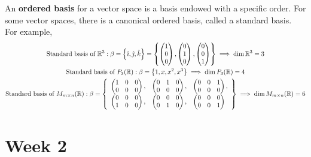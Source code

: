 \documentclass{report}
\begin{document}
An \textbf{ordered basis} for a vector space is a basis endowed with a specific order. For some vector spaces, there is a canonical ordered basis, called a standard basis. For example,
\begin{gather*}
  \text{Standard basis of }\mathbb{R}^3: \beta = \left\lbrace \hat{\imath}, \hat{\jmath}, \hat{k} \right\rbrace = \left\lbrace \begin{pmatrix} 1 \\ 0 \\ 0 \end{pmatrix}, \begin{pmatrix} 0 \\ 1 \\ 0 \end{pmatrix}, \begin{pmatrix} 0 \\ 0 \\ 1 \end{pmatrix} \right\rbrace \implies \dim\mathbb{R}^3 = 3 \\
  \text{Standard basis of }P_3(\mathbb{R}): \beta = \left\lbrace 1, x, x^2, x^3 \right\rbrace \implies \dim P_3(\mathbb{R}) = 4 \\
  \text{Standard basis of }M_{m\times n}(\mathbb{R}): \beta = \left\lbrace \begin{array}{lll} \begin{pmatrix} 1 & 0 & 0 \\ 0 & 0 & 0 \end{pmatrix}, & \begin{pmatrix} 0 & 1 & 0 \\ 0 & 0 & 0 \end{pmatrix}, & \begin{pmatrix} 0 & 0 & 1 \\ 0 & 0 & 0 \end{pmatrix}, \\ \begin{pmatrix} 0 & 0 & 0 \\ 1 & 0 & 0 \end{pmatrix}, & \begin{pmatrix} 0 & 0 & 0 \\ 0 & 1 & 0 \end{pmatrix}, & \begin{pmatrix} 0 & 0 & 0 \\ 0 & 0 & 1 \end{pmatrix} \end{array} \right\rbrace \implies \dim M_{m\times n}(\mathbb{R}) = 6
\end{gather*}

\chapter{Week 2}
\end{document}
